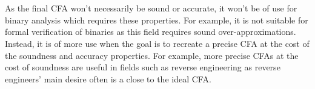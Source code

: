 \documentclass{kththesis}
\begin{document}
\\ \\
As the final CFA won't necessarily be sound or accurate, it won't be of use for binary analysis which requires these properties. For example, it is not suitable for formal verification of binaries as this field requires sound over-approximations. Instead, it is of more use when the goal is to recreate a precise CFA at the cost of the soundness and accuracy properties. For example, more precise CFAs at the cost of soundness are useful in fields such as reverse engineering as reverse engineers' main desire often is a close to the ideal CFA.


\end{document}
